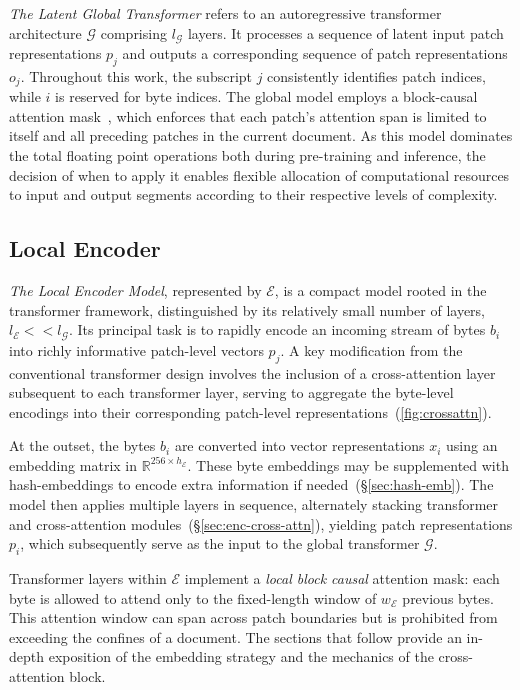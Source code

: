 \textit{The Latent Global Transformer} refers to an autoregressive transformer architecture $\mathcal{G}$ comprising $l_{\mathcal{G}}$ layers. It processes a sequence of latent input patch representations $p_j$ and outputs a corresponding sequence of patch representations $o_j$. Throughout this work, the subscript $j$ consistently identifies patch indices, while $i$ is reserved for byte indices. The global model employs a block-causal attention mask~\citep{dubey2024llama}, which enforces that each patch’s attention span is limited to itself and all preceding patches in the current document. As this model dominates the total floating point operations both during pre-training and inference, the decision of when to apply it enables flexible allocation of computational resources to input and output segments according to their respective levels of complexity.

\subsection{Local Encoder}
\label{section:local}

\textit{The Local Encoder Model}, represented by $\mathcal{E}$, is a compact model rooted in the transformer framework, distinguished by its relatively small number of layers, $l_{\mathcal{E}} << l_{\mathcal{G}}$. Its principal task is to rapidly encode an incoming stream of bytes $b_i$ into richly informative patch-level vectors $p_j$. A key modification from the conventional transformer design involves the inclusion of a cross-attention layer subsequent to each transformer layer, serving to aggregate the byte-level encodings into their corresponding patch-level representations~(\autoref{fig:crossattn}).

At the outset, the bytes $b_i$ are converted into vector representations $x_i$ using an embedding matrix in $\mathbb{R}^{256 \times h_{\mathcal{E}}}$. These byte embeddings may be supplemented with hash-embeddings to encode extra information if needed~(\S\ref{sec:hash-emb}). The model then applies multiple layers in sequence, alternately stacking transformer and cross-attention modules~(\S\ref{sec:enc-cross-attn}), yielding patch representations $p_i$, which subsequently serve as the input to the global transformer $\mathcal{G}$.

Transformer layers within $\mathcal{E}$ implement a \textit{local block causal} attention mask: each byte is allowed to attend only to the fixed-length window of $w_{\mathcal{E}}$ previous bytes. This attention window can span across patch boundaries but is prohibited from exceeding the confines of a document. The sections that follow provide an in-depth exposition of the embedding strategy and the mechanics of the cross-attention block.

